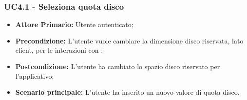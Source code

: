 \subsubsection{UC4.1 - Seleziona quota disco}
\label{UC4.1}
\begin{itemize}
\item \textbf{Attore Primario:} Utente autenticato;
\item \textbf{Precondizione:} L'utente vuole cambiare la dimensione disco riservata, lato client, per le interazioni con ;
\item \textbf{Postcondizione:} L'utente ha cambiato lo spazio disco riservato per l'applicativo;
\item \textbf{Scenario principale:} L'utente ha inserito un nuovo valore di quota disco.
\end{itemize}